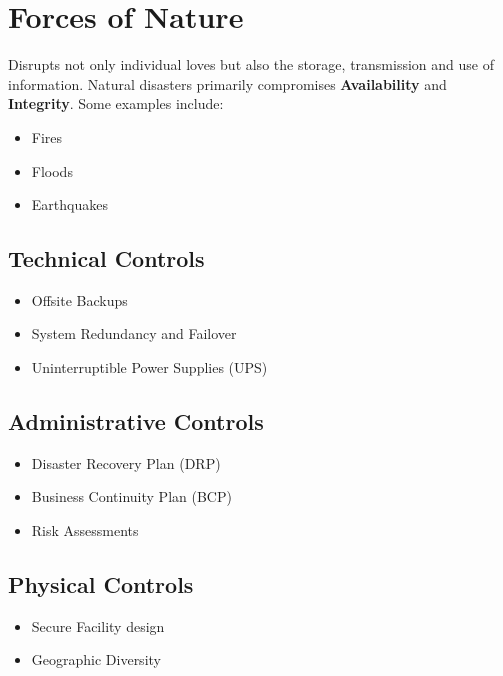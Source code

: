 \documentclass[12pt letter]{report}
\begin{document}
\section{Forces of Nature}

Disrupts not only individual loves but also the storage, transmission
and use of information. Natural disasters primarily compromises
\textbf{Availability} and \textbf{Integrity}. Some examples include:
\begin{itemize}
  \item Fires
  \item Floods
  \item Earthquakes
\end{itemize}

\subsection{Technical Controls}
\begin{itemize}
  \item Offsite Backups
  \item System Redundancy and Failover
  \item Uninterruptible Power Supplies (UPS)
\end{itemize}

\subsection{Administrative Controls}
\begin{itemize}
  \item Disaster Recovery Plan (DRP)
  \item Business Continuity Plan (BCP)
  \item Risk Assessments
\end{itemize}

\subsection{Physical Controls}
\begin{itemize}
  \item Secure Facility design
  \item Geographic Diversity
\end{itemize}
\end{document}
